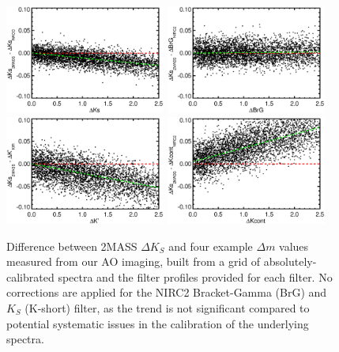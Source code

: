 \documentclass[twocolumn]{aastex62}
\begin{document}
\begin{figure}[htp]
\begin{center}
\includegraphics[width=0.47\textwidth]{NACO_Ks.eps}
\includegraphics[width=0.47\textwidth]{NIRC2_BrG.eps}
\includegraphics[width=0.47\textwidth]{KIR_Kp.eps}
\includegraphics[width=0.47\textwidth]{NIRC2_Kcont.eps}
\caption{Difference between 2MASS $\Delta K_S$ and four example $\Delta m$ values measured from our AO imaging, built from a grid of absolutely-calibrated spectra and the filter profiles provided for each filter. No corrections are applied for the NIRC2 Bracket-Gamma (BrG) and $K_S$ (K-short) filter, as the trend is not significant compared to potential systematic issues in the calibration of the underlying spectra. }
\label{fig:mags}
\end{center}
\end{figure}
\end{document}
